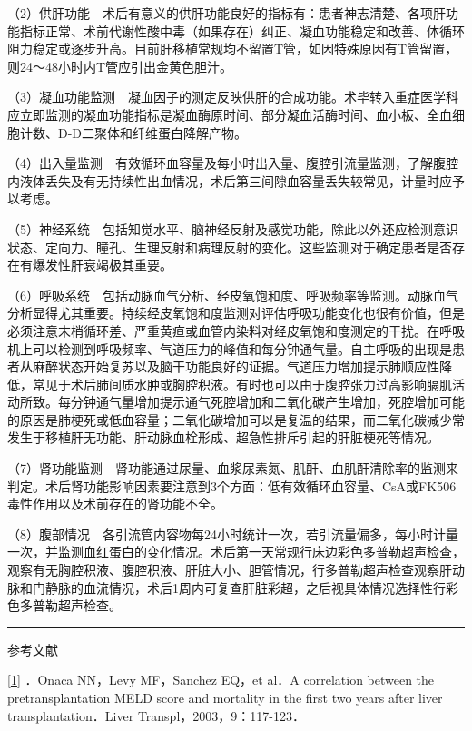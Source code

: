 （2）供肝功能　术后有意义的供肝功能良好的指标有：患者神志清楚、各项肝功能指标正常、术前代谢性酸中毒（如果存在）纠正、凝血功能稳定和改善、体循环阻力稳定或逐步升高。目前肝移植常规均不留置T管，如因特殊原因有T管留置，则24～48小时内T管应引出金黄色胆汁。

（3）凝血功能监测　凝血因子的测定反映供肝的合成功能。术毕转入重症医学科应立即监测的凝血功能指标是凝血酶原时间、部分凝血活酶时间、血小板、全血细胞计数、D-D二聚体和纤维蛋白降解产物。

（4）出入量监测　有效循环血容量及每小时出入量、腹腔引流量监测，了解腹腔内液体丢失及有无持续性出血情况，术后第三间隙血容量丢失较常见，计量时应予以考虑。

（5）神经系统　包括知觉水平、脑神经反射及感觉功能，除此以外还应检测意识状态、定向力、瞳孔、生理反射和病理反射的变化。这些监测对于确定患者是否存在有爆发性肝衰竭极其重要。

（6）呼吸系统　包括动脉血气分析、经皮氧饱和度、呼吸频率等监测。动脉血气分析显得尤其重要。持续经皮氧饱和度监测对评估呼吸功能变化也很有价值，但是必须注意末梢循环差、严重黄疸或血管内染料对经皮氧饱和度测定的干扰。在呼吸机上可以检测到呼吸频率、气道压力的峰值和每分钟通气量。自主呼吸的出现是患者从麻醉状态开始复苏以及脑干功能良好的证据。气道压力增加提示肺顺应性降低，常见于术后肺间质水肿或胸腔积液。有时也可以由于腹腔张力过高影响膈肌活动所致。每分钟通气量增加提示通气死腔增加和二氧化碳产生增加，死腔增加可能的原因是肺梗死或低血容量；二氧化碳增加可以是复温的结果，而二氧化碳减少常发生于移植肝无功能、肝动脉血栓形成、超急性排斥引起的肝脏梗死等情况。

（7）肾功能监测　肾功能通过尿量、血浆尿素氮、肌酐、血肌酐清除率的监测来判定。术后肾功能影响因素要注意到3个方面：低有效循环血容量、CsA或FK506毒性作用以及术前存在的肾功能不全。

（8）腹部情况　各引流管内容物每24小时统计一次，若引流量偏多，每小时计量一次，并监测血红蛋白的变化情况。术后第一天常规行床边彩色多普勒超声检查，观察有无胸腔积液、腹腔积液、肝脏大小、胆管情况，行多普勒超声检查观察肝动脉和门静脉的血流情况，术后1周内可复查肝脏彩超，之后视具体情况选择性行彩色多普勒超声检查。

\begin{center}\rule{0.5\linewidth}{\linethickness}\end{center}

参考文献

\protect\hyperlink{text00020.htmlux5cux23ch1-19-back}{{[}1{]}} ．Onaca
NN，Levy MF，Sanchez EQ，et al．A correlation between the
pretransplantation MELD score and mortality in the first two years after
liver transplantation．Liver Transpl，2003，9：117-123．

